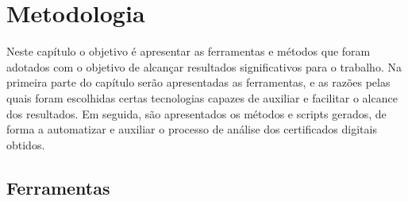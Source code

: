 
 

\chapter[Metodologia]{Metodologia}
	
	Neste capítulo o objetivo é apresentar as ferramentas e métodos que foram adotados com o objetivo de alcançar resultados significativos para o trabalho. Na primeira parte do capítulo serão apresentadas as ferramentas, e as razões pelas quais foram escolhidas certas tecnologias capazes de auxiliar e facilitar o alcance dos resultados. Em seguida, são apresentados os métodos e scripts gerados, de forma a automatizar e auxiliar o processo de análise dos certificados digitais obtidos.
	
	\section[Ferramentas]{Ferramentas}
	
